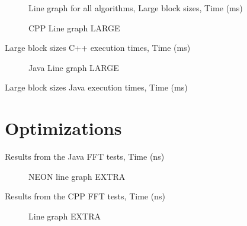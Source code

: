 \begin{figure}
    \centering
    \caption{Line graph for all algorithms, Large block sizes, Time (ms)}
    \label{fig:all:line:large}
    
\end{figure}

\begin{figure}
    \centering
    \label{fig:cpp:line:large}
    \caption{CPP Line graph LARGE}
    
\end{figure}
\begin{table}
    \centering
    \label{tab:cpp:large}
    \caption{Large block sizes C++ execution times, Time (ms)}
    \resizebox{\columnwidth}{!}{
        
    }
\end{table}


\begin{figure}
    \centering
    \label{fig:java:line:large}
    \caption{Java Line graph LARGE}
    
\end{figure}
\begin{table}
    \centering
    \label{tab:java:large}
    \caption{Large block sizes Java execution times, Time (ms)}
    \resizebox{\columnwidth}{!}{
        
    }
\end{table}





\section{Optimizations}

\begin{table}
    \centering
    \label{tab:java:extra}
    \caption{Results from the Java FFT tests, Time (ns)}
    \resizebox{\columnwidth}{!}{
        
    }
\end{table}

\begin{figure}
    \centering
    \caption{NEON line graph EXTRA}
    
\end{figure}

\begin{table}
    \centering
    \label{tab:jni:common}
    \caption{Results from the CPP FFT tests, Time (ns)}
    \resizebox{\columnwidth}{!}{
        
    }
\end{table}

\begin{figure}
    \centering
    \caption{Line graph EXTRA}
    
\end{figure}

